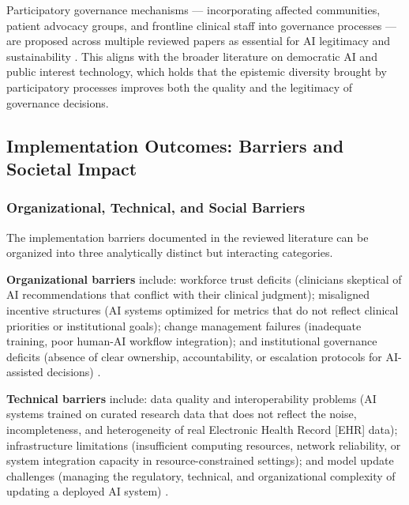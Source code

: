 Participatory governance mechanisms — incorporating affected communities,
patient advocacy groups, and frontline clinical staff into governance
processes — are proposed across multiple reviewed papers as essential
for AI legitimacy and sustainability \citep{bouderhem2025shaping,
pham2025ethical}. This aligns with the broader literature on democratic
AI and public interest technology, which holds that the epistemic
diversity brought by participatory processes improves both the quality
and the legitimacy of governance decisions.


\subsection{Implementation Outcomes: Barriers and Societal Impact}
\label{sec:results_implementation}


\subsubsection{Organizational, Technical, and Social Barriers}
\label{sec:impl_barriers}

The implementation barriers documented in the reviewed literature can be
organized into three analytically distinct but interacting categories.

\textbf{Organizational barriers} include: workforce trust deficits (clinicians
skeptical of AI recommendations that conflict with their clinical judgment);
misaligned incentive structures (AI systems optimized for metrics that do
not reflect clinical priorities or institutional goals); change management
failures (inadequate training, poor human-AI workflow integration); and
institutional governance deficits (absence of clear ownership, accountability,
or escalation protocols for AI-assisted decisions)
\citep{tian2026pilottrap, pham2025ethical}.

\textbf{Technical barriers} include: data quality and interoperability
problems (AI systems trained on curated research data that does not reflect
the noise, incompleteness, and heterogeneity of real Electronic Health Record
[EHR] data); infrastructure limitations (insufficient computing resources,
network reliability, or system integration capacity in resource-constrained
settings); and model update challenges (managing the regulatory, technical,
and organizational complexity of updating a deployed AI system)
\citep{warraich2024fda, abulibdeh2025illusion}.

